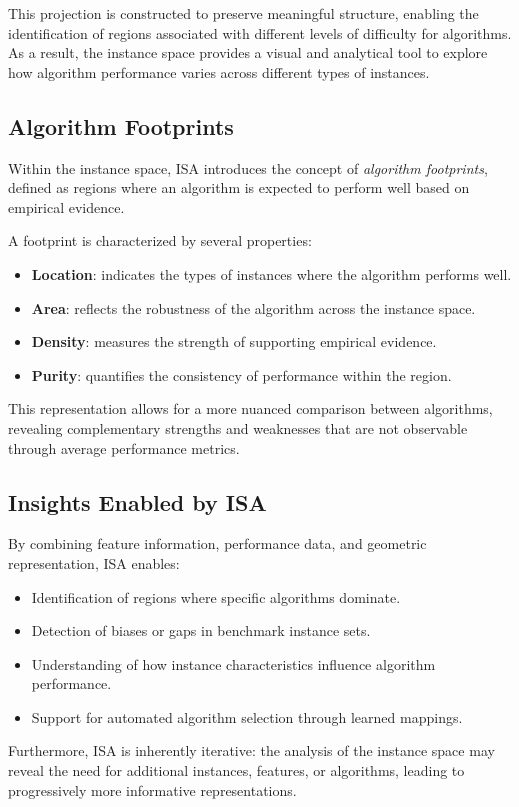 \documentclass[12pt]{article}
\begin{document}
This projection is constructed to preserve meaningful structure, enabling the identification of regions associated with different levels of difficulty for algorithms. As a result, the instance space provides a visual and analytical tool to explore how algorithm performance varies across different types of instances.

\subsection{Algorithm Footprints}

Within the instance space, ISA introduces the concept of \textit{algorithm footprints}, defined as regions where an algorithm is expected to perform well based on empirical evidence.

A footprint is characterized by several properties:

\begin{itemize}
    \item \textbf{Location}: indicates the types of instances where the algorithm performs well.
    \item \textbf{Area}: reflects the robustness of the algorithm across the instance space.
    \item \textbf{Density}: measures the strength of supporting empirical evidence.
    \item \textbf{Purity}: quantifies the consistency of performance within the region.
\end{itemize}

This representation allows for a more nuanced comparison between algorithms, revealing complementary strengths and weaknesses that are not observable through average performance metrics.

\subsection{Insights Enabled by ISA}

By combining feature information, performance data, and geometric representation, ISA enables:

\begin{itemize}
    \item Identification of regions where specific algorithms dominate.
    \item Detection of biases or gaps in benchmark instance sets.
    \item Understanding of how instance characteristics influence algorithm performance.
    \item Support for automated algorithm selection through learned mappings.
\end{itemize}

Furthermore, ISA is inherently iterative: the analysis of the instance space may reveal the need for additional instances, features, or algorithms, leading to progressively more informative representations.



\newpage
\printbibliography
\end{document}
